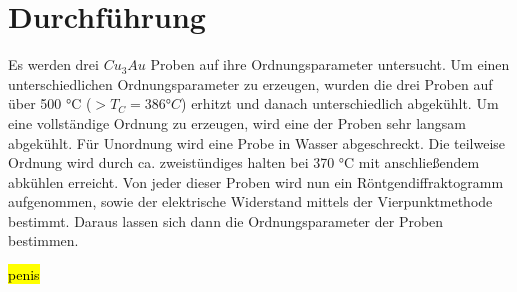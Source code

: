 \section{Durchführung}
    Es werden drei $Cu_3Au$ Proben auf ihre Ordnungsparameter untersucht. Um einen unterschiedlichen Ordnungsparameter
    zu erzeugen, wurden die drei Proben auf über 500 °C ($>T_C = 386 °C$) erhitzt und danach unterschiedlich abgekühlt.
    Um eine vollständige Ordnung zu erzeugen, wird eine der Proben sehr langsam abgekühlt. Für Unordnung wird eine Probe
    in Wasser abgeschreckt. Die teilweise Ordnung wird durch ca. zweistündiges halten bei 370 °C mit anschließendem abkühlen
    erreicht. Von jeder dieser Proben wird nun ein Röntgendiffraktogramm aufgenommen, sowie der elektrische Widerstand 
    mittels der Vierpunktmethode bestimmt. Daraus lassen sich dann die Ordnungsparameter der Proben bestimmen.



    \hl{penis}